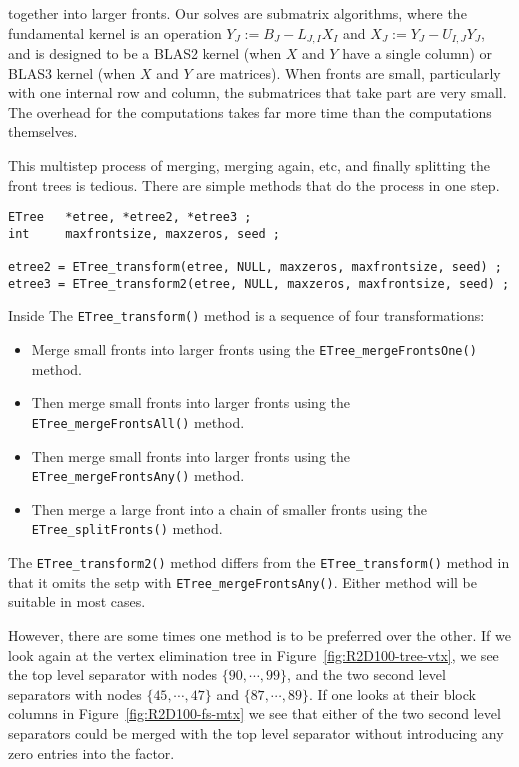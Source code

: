 together into larger fronts.
Our solves are submatrix algorithms, where the fundamental kernel is an
operation 
$Y_J := B_J - L_{J,I} X_I$
and
$X_J := Y_J - U_{I,J} Y_J$,
and is designed to be a BLAS2 kernel (when $X$ and $Y$ have a single
column) or BLAS3 kernel (when $X$ and $Y$ are matrices).
When fronts are small, particularly with one internal row and column,
the submatrices that take part are very small.
The overhead for the computations takes far more time than the
computations themselves.
\par
This multistep process of merging, merging again, etc, and finally 
splitting the front trees is tedious.
There are simple methods that do the process in one step.
\begin{verbatim}
ETree   *etree, *etree2, *etree3 ;
int     maxfrontsize, maxzeros, seed ;

etree2 = ETree_transform(etree, NULL, maxzeros, maxfrontsize, seed) ;
etree3 = ETree_transform2(etree, NULL, maxzeros, maxfrontsize, seed) ;
\end{verbatim}
Inside The {\tt ETree\_transform()} method 
is a sequence of four transformations:
\begin{itemize}
\item
Merge small fronts into larger fronts
using the {\tt ETree\_mergeFrontsOne()} method.
\item
Then merge small fronts into larger fronts
using the {\tt ETree\_mergeFrontsAll()} method.
\item
Then merge small fronts into larger fronts
using the {\tt ETree\_mergeFrontsAny()} method.
\item
Then merge a large front into a chain of smaller fronts
using the {\tt ETree\_splitFronts()} method.
\end{itemize}
The {\tt ETree\_transform2()} method differs from the 
{\tt ETree\_transform()} method in that it omits the
setp with {\tt ETree\_mergeFrontsAny()}.
Either method will be suitable in most cases.
\par
However, there are some times one method is to be preferred over
the other.
If we look again at the vertex elimination tree
in Figure~\ref{fig:R2D100-tree-vtx}, we see the top level separator
with nodes $\{90,\cdots,99\}$, and the two second level separators
with nodes $\{45,\cdots,47\}$ and $\{87,\cdots,89\}$.
If one looks at their block columns in Figure~\ref{fig:R2D100-fs-mtx}
we see that either of the two second level separators could be merged
with the top level separator without introducing any zero entries
into the factor.
